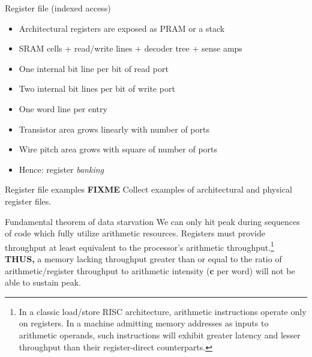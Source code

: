\documentclass[xcolor={dvipsnames,table}]{beamer}
\begin{document}
\begin{frame}{Register file (indexed access)}
\begin{itemize}
\item Architectural registers are exposed as PRAM or a stack
\item SRAM cells + read/write lines + decoder tree + sense amps
\item One internal bit line per bit of read port
\item Two internal bit lines per bit of write port
\item One word line per entry
\item Transistor area grows linearly with number of ports
\item Wire pitch area grows with square of number of ports
\item Hence: register \textit{banking}
\end{itemize}
\end{frame}

\begin{frame}{Register file examples}
\huge \textbf{FIXME}
Collect examples of architectural and physical register files.
\end{frame}

\begin{frame}{Fundamental theorem of data starvation}
We can only hit peak during sequences of code which fully
utilize arithmetic resources. Registers must provide throughput
at least equivalent to the processor's arithmetic throughput.\footnote{\tiny{In a classic load/store RISC architecture, arithmetic instructions operate
only on registers. In a machine admitting memory addresses as inputs to
arithmetic operands, such instructions will exhibit greater latency and lesser throughput
than their register-direct counterparts.}}\\
\vspace{.35in}
\textbf{THUS,} a memory lacking throughput greater than or equal to the ratio of
arithmetic/register throughput to arithmetic intensity ($\textbf{c}$ per word) will not be able
to sustain peak.
\end{frame}
\end{document}
